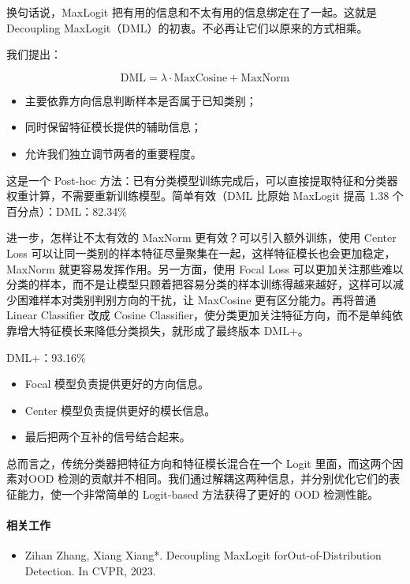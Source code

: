 换句话说，MaxLogit 把有用的信息和不太有用的信息绑定在了一起。这就是Decoupling MaxLogit（DML）的初衷。不必再让它们以原来的方式相乘。

我们提出：

\[
\mathrm{DML}=\lambda\cdot\mathrm{MaxCosine}+\mathrm{MaxNorm}
\]

\begin{itemize}
  \item 主要依靠方向信息判断样本是否属于已知类别；
  \item 同时保留特征模长提供的辅助信息；
  \item 允许我们独立调节两者的重要程度。
\end{itemize}

这是一个 Post-hoc 方法：已有分类模型训练完成后，可以直接提取特征和分类器权重计算，不需要重新训练模型。简单有效（DML 比原始 MaxLogit 提高 1.38 个百分点）：DML：82.34\%

进一步，怎样让不太有效的 MaxNorm 更有效？可以引入额外训练，使用 Center Loss 可以让同一类别的样本特征尽量聚集在一起，这样特征模长也会更加稳定，MaxNorm 就更容易发挥作用。另一方面，使用 Focal Loss 可以更加关注那些难以分类的样本，而不是让模型只顾着把容易分类的样本训练得越来越好，这样可以减少困难样本对类别判别方向的干扰，让 MaxCosine 更有区分能力。再将普通 Linear Classifier 改成 Cosine Classifier，使分类更加关注特征方向，而不是单纯依靠增大特征模长来降低分类损失，就形成了最终版本 DML+。

DML+：93.16\%

\begin{itemize}
  \item Focal 模型负责提供更好的方向信息。
  \item Center 模型负责提供更好的模长信息。
  \item 最后把两个互补的信号结合起来。
\end{itemize}

总而言之，传统分类器把特征方向和特征模长混合在一个 Logit 里面，而这两个因素对OOD 检测的贡献并不相同。我们通过解耦这两种信息，并分别优化它们的表征能力，使一个非常简单的 Logit-based 方法获得了更好的 OOD 检测性能。

\paragraph{相关工作}

\begin{itemize}
  \item Zihan Zhang, Xiang Xiang*. Decoupling MaxLogit forOut-of-Distribution Detection. In CVPR, 2023.
\end{itemize}

